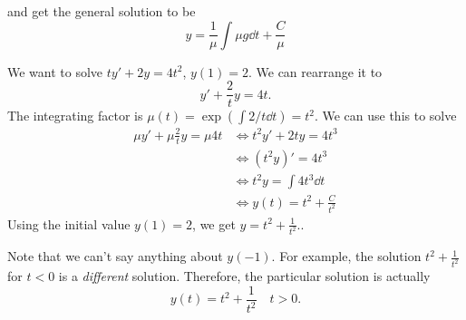 \begin{itemize}
\begin{equation}
    \end{equation}
    and get the general solution to be 
    \begin{equation}
        y = \frac{1}{\mu} \int \mu g \dd{t} + \frac{C}{\mu}
    \end{equation}
    \begin{example}
        We want to solve $ty'+2y=4t^2$, $y(1)=2$. We can rearrange it to 
        \begin{equation}
            y'+\frac{2}{t}y = 4t.
        \end{equation}
        The integrating factor is $\mu(t) = \exp\left(\int 2/t \dd{t}\right)=t^2$. We can use this to solve 
        \begin{align}
            \mu y' + \mu \frac{2}{t}y = \mu 4t &\iff  t^2y' + 2ty = 4t^3 \\ 
            &\iff  (t^2y)' = 4t^3 \\ 
            &\iff  t^2y = \int 4t^3 \dd{t} \\ 
            &\iff y(t) = t^2 + \frac{C}{t^2} 
        \end{align}
        Using the initial value $y(1)=2$, we get $\boxed{y=t^2 + \frac{1}{t^2}}.$.
        \vspace{2mm}

        Note that we can't say anything about $y(-1).$ For example, the solution $t^2 + \frac{1}{t^2}$ for $t<0$ is a \textit{different} solution. Therefore, the particular solution is actually 
        \begin{equation}
            y(t) = t^2 + \frac{1}{t^2} \quad t>0.
        \end{equation}
    \end{example}
\end{itemize}